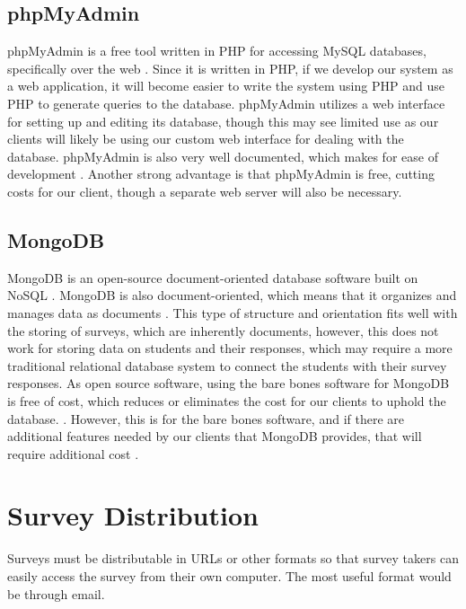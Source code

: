 \documentclass[letterpaper,10pt,serif, draftclsnofoot,onecolumn, compsoc, titlepage]{IEEEtran}
\begin{document}
\subsection{phpMyAdmin}
phpMyAdmin is a free tool written in PHP for accessing MySQL databases, specifically over the web \cite{phpmyadmin}.
Since it is written in PHP, if we develop our system as a web application, it will become easier to write the system using PHP and use PHP to generate queries to the database.
phpMyAdmin utilizes a web interface for setting up and editing its database, though this may see limited use as our clients will likely be using our custom web interface for dealing with the database.
phpMyAdmin is also very well documented, which makes for ease of development \cite{phpmyadmin}.
Another strong advantage is that phpMyAdmin is free, cutting costs for our client, though a separate web server will also be necessary.
\subsection{MongoDB}
MongoDB is an open-source document-oriented database software built on NoSQL \cite{mongodb}.
MongoDB is also document-oriented, which means that it organizes and manages data as documents \cite{docdb}.
This type of structure and orientation fits well with the storing of surveys, which are inherently documents, however, this does not work for storing data on students and their responses, which may require a more traditional relational database system to connect the students with their survey responses.
As open source software, using the bare bones software for MongoDB is free of cost, which reduces or eliminates the cost for our clients to uphold the database. \cite{mongo_cost}.
However, this is for the bare bones software, and if there are additional features needed by our clients that MongoDB provides, that will require additional cost \cite{mongo_cost}.

\section{Survey Distribution}
Surveys must be distributable in URLs or other formats so that survey takers can easily access the survey from their own computer. The most useful format would be through email.
\end{document}
